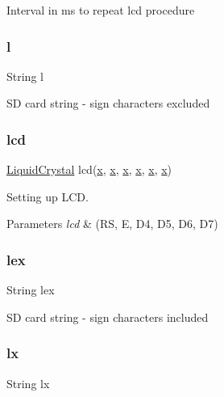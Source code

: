 Interval in ms to repeat lcd procedure \mbox{\label{_w_s_8ino_a3d755e761d498d63ec8ff4ba107f9b37}} 
\subsubsection{\texorpdfstring{l}{l}}
{\footnotesize\ttfamily String l}

SD card string -\/ sign characters excluded \mbox{\label{_w_s_8ino_ab5c27db0e833e3f4cf8f473022f11ecb}} 
\subsubsection{\texorpdfstring{lcd}{lcd}}
{\footnotesize\ttfamily \hyperlink{class_liquid_crystal}{Liquid\+Crystal} lcd(\hyperlink{_w_s_8ino_ab06e9aa782b61ccfb42f7c48996f6ed4}{x}, \hyperlink{_w_s_8ino_ab06e9aa782b61ccfb42f7c48996f6ed4}{x}, \hyperlink{_w_s_8ino_ab06e9aa782b61ccfb42f7c48996f6ed4}{x}, \hyperlink{_w_s_8ino_ab06e9aa782b61ccfb42f7c48996f6ed4}{x}, \hyperlink{_w_s_8ino_ab06e9aa782b61ccfb42f7c48996f6ed4}{x}, \hyperlink{_w_s_8ino_ab06e9aa782b61ccfb42f7c48996f6ed4}{x})}



Setting up L\+CD. 


\begin{DoxyParams}{Parameters}
{\em lcd} & (RS, E, D4, D5, D6, D7) \\
\hline
\end{DoxyParams}
\mbox{\label{_w_s_8ino_a50a22a42df187974707beaeeb46ee1ec}} 
\subsubsection{\texorpdfstring{lex}{lex}}
{\footnotesize\ttfamily String lex}

SD card string -\/ sign characters included \mbox{\label{_w_s_8ino_a27093eb2a51400e98a5a829312514cab}} 
\subsubsection{\texorpdfstring{lx}{lx}}
{\footnotesize\ttfamily String lx}

